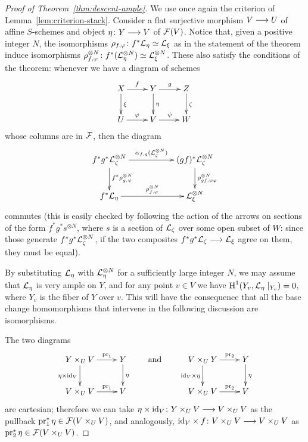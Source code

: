 \begin{4   STACKS}
\begin{4.3 Descent for morphisms of schemes}
\begin{proof}[Proof of Theorem~\ref{thm:descent-ample}]
We use once again the criterion of Lemma~\ref{lem:criterion-stack}. Consider a flat surjective morphism $V \arr U$ of affine $S$-schemes and object $\eta \colon Y \arr V$ of $\mathcal{F}(V)$. Notice that, given a positive integer $N$, the isomorphisms $\rho_{f, \varphi} \colon f^*\mathcal{L}_\eta \simeq \mathcal{L}_\xi$ as in the statement of the theorem induce isomorphisms $\rho_{f, \varphi}^{\otimes N} \colon  f^*(\mathcal{L}_\eta^{\otimes N}) \simeq \mathcal{L}_\xi^{\otimes N}$. These also satisfy the conditions of the theorem:  whenever we have a diagram of schemes
   \[
   \xymatrix{
   X \ar[r]^f \ar[d]^\xi & Y \ar[r]^g \ar[d]^\eta & Z \ar[d]^\zeta \\
   U \ar[r]^\phi         & V \ar[r]^\psi           & W
   }
   \]
whose columns are in $\mathcal{F}$, then the diagram
   \[
   \xymatrix@C+30pt{
   f^*g^*\cL_\zeta^{\otimes N} \ar[r]^-{\isoass_{f,g}(\cL_\zeta^{\otimes N})}
      \ar[d]^{f^* \rho_{g, \psi}^{\otimes N}}
      & (gf)^*\cL_\zeta^{\otimes N} \ar[d]^{\rho_{gf, \psi\phi}^{\otimes N}}
   \\
   f^* \cL_\eta  \ar[r]^-{\rho_{f, \phi}^{\otimes N}}&
      {}\cL_\xi ^{\otimes N}
   }
   \]
commutes (this is easily checked by following the action of the arrows on sections of the form $f^{*}g^{*}s^{\otimes N}$, where $s$ is a section of $\mathcal{L}_{\zeta}$ over some open subset of $W$: since those generate $f^{*}g^{*}\mathcal{L}_{\zeta}^{\otimes N}$, if the two composites $f^{*}g^{*}\cL_{\zeta} \arr \cL_{\xi}$ agree on them, they must be equal).

By substituting $\mathcal{L}_{\eta}$ with $\mathcal{L}_{\eta}^{\otimes N}$ for a sufficiently large integer $N$, we may assume that $\mathcal{L}_\eta$ is very ample on $Y$, and for any point $v \in V$ we have $\operatorname{H}^1(Y_v, \mathcal{L}_\eta \mid_{Y_v}) = 0$, where $Y_v$ is the fiber of $Y$ over $v$. This will have the consequence that all the base change homomorphisms that intervene in the following discussion are isomorphisms.

 The two diagrams
   \[
   \xymatrix{
   Y \times_U V \ar[r]^-{\pr_1} \ar[d]_{\eta \times \id_V}
   & Y \ar[d]^\eta   \\
   V \times_U V \ar[r]^-{\pr_1}    & V
   }
   \qquad \text{and} \qquad
   \xymatrix{
   V \times_U Y\ar[r]^-{\pr_2} \ar[d]_{\id_V \times \eta}
   & Y \ar[d]^\eta  \\
   V \times_U V \ar[r]^-{\pr_2} & V
   }
   \]
are cartesian; therefore we can take $\eta \times \id_V \colon Y \times_U V \arr V \times_U V$ as the pullback $\operatorname{pr}_1^* \eta \in \mathcal{F}(V \times_U V)$, and analogously, $\id_V \times f \colon V \times_U V \arr V \times_U V$ as $\operatorname{pr}_2^* \eta \in \mathcal{F}(V \times_U V)$.


\end{proof}
\end{4.3 Descent for morphisms of schemes}
\end{4   STACKS}
